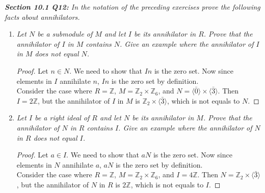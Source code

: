 \documentclass{article}
\begin{document}
\it \textbf{Section 10.1 Q12:} In the notation of the preceding exercises
  prove the following facts about annihilators.
  \begin{enumerate}[label={(\alph*)}]
    \item \it Let $N$ be a submodule of $M$ and let $I$ be its annihilator
      in $R$. Prove that the annihilator of $I$ in $M$ contains $N$. Give
      an example where the annihilator of $I$ in $M$ does not equal $N$.

      \begin{proof}
        Let $n\in N$. We need to show that $In$ is the zero set. Now since
        elements in $I$ annihilate $n$, $In$ is the zero set by definition.
        \\

        Consider the case where $R=\mathbb{Z}$,
        $M=\mathbb{Z}_2\times\mathbb{Z}_6$, and $N=\langle\bar{0}\rangle
        \times\langle\bar{3}\rangle$. Then $I=2\mathbb{Z}$, but the
        annihilator of $I$ in $M$ is
        $\mathbb{Z}_2\times\langle\bar{3}\rangle$, which is not equals to
        $N$.
      \end{proof}

    \item \it Let $I$ be a right ideal of $R$ and let $N$ be its
      annihilator in $M$. Prove that the annihilator of $N$ in $R$ contains
      $I$. Give an example where the annihilator of $N$ in $R$ does not
      equal $I$.

      \begin{proof}
        Let $a\in I$. We need to show that $aN$ is the zero set. Now since
        elements in $N$ annihilate $a$, $aN$ is the zero set by definition.
        \\

        Consider the case where $R=\mathbb{Z}$,
        $M=\mathbb{Z}_2\times\mathbb{Z}_6$, and $I=4\mathbb{Z}$. Then
        $N=\mathbb{Z}_2\times\langle\bar{3}\rangle$, but the annihilator of
        $N$ in $R$ is $2\mathbb{Z}$, which is not equals to $I$.
      \end{proof}
  \end{enumerate}
\end{document}
